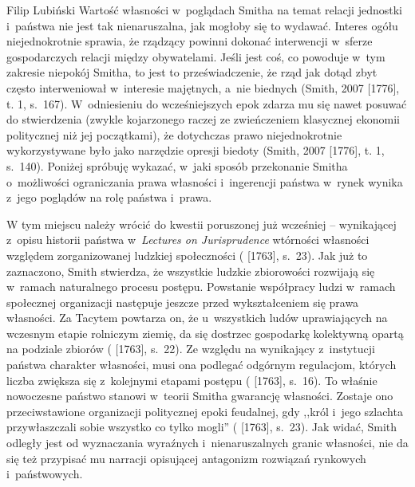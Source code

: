 \begin{artplenv}{Filip Lubiński}
Wartość własności w~poglądach Smitha na temat relacji jednostki i~państwa nie jest tak nienaruszalna, jak mogłoby
się to wydawać. Interes ogółu niejednokrotnie sprawia, że rządzący powinni dokonać interwencji w~sferze gospodarczych
relacji między obywatelami. Jeśli jest coś, co powoduje w~tym zakresie niepokój Smitha, to jest to przeświadczenie, że
rząd jak dotąd zbyt często interweniował w~interesie majętnych, a~nie biednych
\label{ref:RNDKTNonQx9Ln}(Smith, 2007 [1776], t. 1, s.~167).
W~odniesieniu do wcześniejszych epok zdarza mu się nawet posuwać do stwierdzenia (zwykle
kojarzonego raczej ze zwieńczeniem klasycznej ekonomii politycznej niż jej początkami), że dotychczas prawo
niejednokrotnie wykorzystywane było jako narzędzie opresji biedoty
\label{ref:RNDK2BdJNopfX}(Smith, 2007 [1776], t. 1, s.~140).
Poniżej spróbuję wykazać, w~jaki sposób przekonanie Smitha o~możliwości ograniczania
prawa własności i~ingerencji państwa w~rynek wynika z~jego poglądów na rolę państwa i~prawa.

W tym miejscu należy wrócić do kwestii poruszonej już wcześniej -- wynikającej z~opisu historii
państwa w~\textit{Lectures on Jurisprudence} wtórności własności względem zorganizowanej ludzkiej społeczności
(\cite{smith_lectures_1982} [1763], s.~23).
Jak już to zaznaczono, Smith stwierdza, że wszystkie ludzkie
zbiorowości rozwijają się w~ramach naturalnego procesu postępu. Powstanie współpracy ludzi w~ramach społecznej
organizacji następuje jeszcze przed wykształceniem się prawa własności. Za Tacytem powtarza on, że u~wszystkich ludów
uprawiających na wczesnym etapie rolniczym ziemię, da się dostrzec gospodarkę kolektywną opartą na podziale zbiorów
(\cite{smith_lectures_1982} [1763], s.~22).
Ze względu na wynikający z~instytucji państwa charakter
własności, musi ona podlegać odgórnym regulacjom, których liczba zwiększa się z~kolejnymi etapami postępu
(\cite{smith_lectures_1982} [1763], s.~16).
To właśnie nowoczesne państwo stanowi w~teorii Smitha gwarancję
własności. Zostaje ono przeciwstawione organizacji politycznej epoki feudalnej, gdy ,,król i~jego szlachta
przywłaszczali sobie wszystko co tylko mogli''
(\cite{smith_lectures_1982} [1763], s.~23).
Jak widać, Smith
odległy jest od wyznaczania wyraźnych i~nienaruszalnych granic własności, nie da się też przypisać mu narracji
opisującej antagonizm rozwiązań rynkowych i~państwowych.


\end{artplenv}
